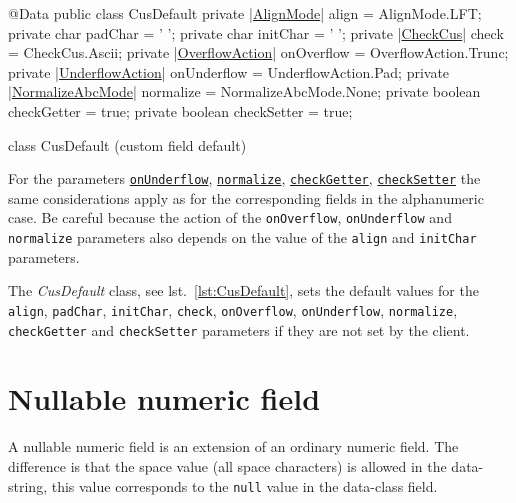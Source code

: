 \documentclass[a4paper,10pt]{report}
\newenvironment{elisting}[1][H]
  {\captionsetup{aboveskip=0pt}\begin{listing}[#1]}
  {\end{listing}%
}
\begin{document}
\begin{elisting}[!htb]
\begin{javacode}
@Data
public class CusDefault {
    private |\hyperref[lst:AlignMode]{AlignMode}| align = AlignMode.LFT;
    private char padChar = ' ';
    private char initChar = ' ';
    private |\hyperref[lst:CheckCus]{CheckCus}| check = CheckCus.Ascii;
    private |\hyperref[lst:OverflowAction]{OverflowAction}| onOverflow = OverflowAction.Trunc;
    private |\hyperref[lst:UnderflowAction]{UnderflowAction}| onUnderflow = UnderflowAction.Pad;
    private |\hyperref[lst:NormalizeAbcMode]{NormalizeAbcMode}| normalize = NormalizeAbcMode.None;
    private boolean checkGetter = true;
    private boolean checkSetter = true;
}
\end{javacode}
\caption{class CusDefault (custom field default)}
\label{lst:CusDefault}
\end{elisting}

For the parameters 
\hyperlink{abc:unf}{\texttt{onUnderflow}}, 
\hyperlink{abc:nrm}{\texttt{normalize}},
\hyperlink{abc:get}{\texttt{checkGetter}},
\hyperlink{abc:get}{\texttt{checkSetter}}
the same considerations apply as for the corresponding fields in the 
alphanumeric case. Be careful because the action of the \verb!onOverflow!, 
\verb!onUnderflow! and \verb!normalize! parameters also depends on the value of 
the \verb!align! and \verb!initChar! parameters.

The \textsl{CusDefault} class, see lst.~\ref{lst:CusDefault}, sets the default 
values for the \verb!align!, \verb!padChar!, \verb!initChar!, 
\verb!check!, \texttt{onOver\-flow}, \verb!onUnderflow!, \verb!normalize!, 
\verb!checkGetter! and \verb!checkSetter! parameters if they are not set by the 
client.

\section{Nullable numeric field}
A nullable numeric field is an extension of an ordinary numeric field. 
The difference is that the space value (all space characters) is allowed in the 
data-string, this value corresponds to the \verb!null! value in the data-class 
field.
\end{document}

